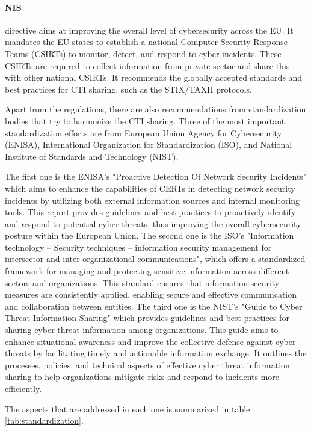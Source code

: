 \paragraph{NIS} directive aims at improving the overall level of cybersecurity across the EU. It mandates the EU states to establish a national Computer Security Response Teams (CSIRTs) to monitor, detect, and respond to cyber incidents. These CSIRTs are required to collect information from private sector and share this with other national CSIRTs. It recommends the globally accepted standards and best practices for CTI sharing, such as the STIX/TAXII protocols.

Apart from the regulations, there are also recommendations from standardization bodies that try to harmonize the CTI sharing. Three of the most important standardization efforts are from European Union Agency for Cybersecurity (ENISA), International Organization for Standardization (ISO), and National Institute of Standards and Technology (NIST).

The first one is the ENISA's "Proactive Detection Of Network Security Incidents" which aims to enhance the capabilities of CERTs in detecting network security incidents by utilizing both external information sources and internal monitoring tools. This report provides guidelines and best practices to proactively identify and respond to potential cyber threats, thus improving the overall cybersecurity posture within the European Union.
The second one is the ISO's "Information technology -- Security techniques -- information security management for intersector and inter-organizational communications", which offers a standardized framework for managing and protecting sensitive information across different sectors and organizations. This standard ensures that information security measures are consistently applied, enabling secure and effective communication and collaboration between entities.
The third one is the NIST's "Guide to Cyber Threat Information Sharing" which provides guidelines and best practices for sharing cyber threat information among organizations. This guide aims to enhance situational awareness and improve the collective defense against cyber threats by facilitating timely and actionable information exchange. It outlines the processes, policies, and technical aspects of effective cyber threat information sharing to help organizations mitigate risks and respond to incidents more efficiently.

The aspects that are addressed in each one is summarized in table \ref*{tab:standardization}. 

